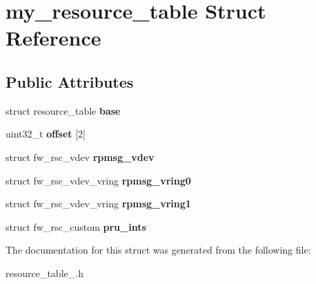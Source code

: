 \hypertarget{structmy__resource__table}{\section{my\-\_\-resource\-\_\-table Struct Reference}
\label{structmy__resource__table}
}
\subsection*{Public Attributes}
\begin{DoxyCompactItemize}
\item 
\hypertarget{structmy__resource__table_adda47ec594877f2985ea341a3171f1c8}{struct resource\-\_\-table {\bfseries base}}\label{structmy__resource__table_adda47ec594877f2985ea341a3171f1c8}

\item 
\hypertarget{structmy__resource__table_a15b50ef30e339db2894c0d8f5b90c8c5}{uint32\-\_\-t {\bfseries offset} \mbox{[}2\mbox{]}}\label{structmy__resource__table_a15b50ef30e339db2894c0d8f5b90c8c5}

\item 
\hypertarget{structmy__resource__table_aa153b2c020968d259d83700cc129b8d6}{struct fw\-\_\-rsc\-\_\-vdev {\bfseries rpmsg\-\_\-vdev}}\label{structmy__resource__table_aa153b2c020968d259d83700cc129b8d6}

\item 
\hypertarget{structmy__resource__table_a68ed7497d8640240d54116b9a4ccf34f}{struct fw\-\_\-rsc\-\_\-vdev\-\_\-vring {\bfseries rpmsg\-\_\-vring0}}\label{structmy__resource__table_a68ed7497d8640240d54116b9a4ccf34f}

\item 
\hypertarget{structmy__resource__table_a75d21c8fd94ff039073280f738b50236}{struct fw\-\_\-rsc\-\_\-vdev\-\_\-vring {\bfseries rpmsg\-\_\-vring1}}\label{structmy__resource__table_a75d21c8fd94ff039073280f738b50236}

\item 
\hypertarget{structmy__resource__table_af76d4f3fc64d591ee6f27e22921e9bc2}{struct fw\-\_\-rsc\-\_\-custom {\bfseries pru\-\_\-ints}}\label{structmy__resource__table_af76d4f3fc64d591ee6f27e22921e9bc2}

\end{DoxyCompactItemize}


The documentation for this struct was generated from the following file\-:\begin{DoxyCompactItemize}
\item 
resource\-\_\-table\-\_.\-h\end{DoxyCompactItemize}
